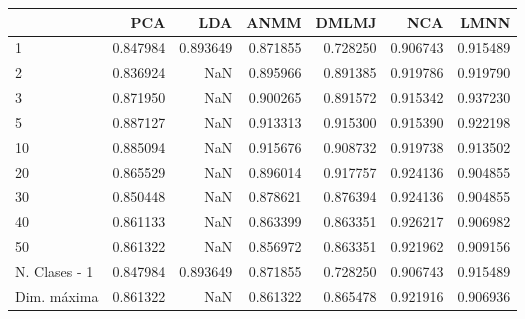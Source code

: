 \begin{tabular}{lrrrrrr}
\toprule
{} &       PCA &       LDA &      ANMM &     DMLMJ &       NCA &      LMNN \\
\midrule
1             &  0.847984 &  0.893649 &  0.871855 &  0.728250 &  0.906743 &  0.915489 \\
2             &  0.836924 &       NaN &  0.895966 &  0.891385 &  0.919786 &  0.919790 \\
3             &  0.871950 &       NaN &  0.900265 &  0.891572 &  0.915342 &  0.937230 \\
5             &  0.887127 &       NaN &  0.913313 &  0.915300 &  0.915390 &  0.922198 \\
10            &  0.885094 &       NaN &  0.915676 &  0.908732 &  0.919738 &  0.913502 \\
20            &  0.865529 &       NaN &  0.896014 &  0.917757 &  0.924136 &  0.904855 \\
30            &  0.850448 &       NaN &  0.878621 &  0.876394 &  0.924136 &  0.904855 \\
40            &  0.861133 &       NaN &  0.863399 &  0.863351 &  0.926217 &  0.906982 \\
50            &  0.861322 &       NaN &  0.856972 &  0.863351 &  0.921962 &  0.909156 \\
N. Clases - 1 &  0.847984 &  0.893649 &  0.871855 &  0.728250 &  0.906743 &  0.915489 \\
Dim. máxima   &  0.861322 &       NaN &  0.861322 &  0.865478 &  0.921916 &  0.906936 \\
\bottomrule
\end{tabular}
